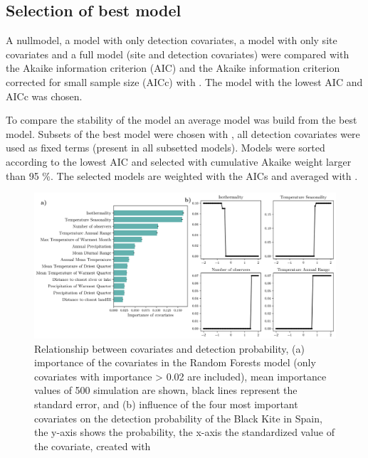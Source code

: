 \begin{multicols}{2}
\subsection*{Selection of best model}
A nullmodel, a model with only detection covariates, a model with only site covariates and a full model (site and detection covariates) were compared with the Akaike information criterion (AIC) and the Akaike information criterion corrected for small sample size (AICc) with \textcite{unmarked}. The model with the lowest AIC and AICc was chosen. 

To compare the stability of the model an average model was build from the best model. Subsets of the best model were chosen with \textcite{Barton2020}, all detection covariates were used as fixed terms (present in all subsetted models). Models were sorted according to the lowest AIC and selected with cumulative Akaike weight \parencite{Wagenmakers2004} larger than 95 \%. The selected models are weighted with the AICs and averaged with \textcite{Barton2020}.

\begin{figure}[t]
	\centering
	\includegraphics[width=\linewidth]{img/random_forest}
	\caption{Relationship between covariates and detection probability, (a) importance of the covariates in the Random Forests model (only covariates with importance > 0.02 are included), mean importance values of 500 simulation are shown, black lines represent the standard error, and (b) influence of the four most important covariates on the detection probability of the Black Kite in Spain, the y-axis shows the probability, the x-axis the standardized value of the covariate, created with \textcite{matplotlib}}
	\label{fig:random_forest}
\end{figure}



\end{multicols}
